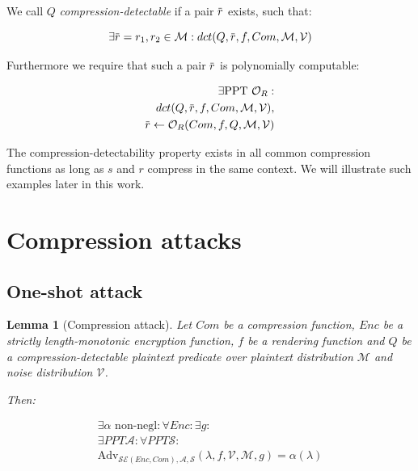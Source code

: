 \documentclass[conference, letterpaper, 10pt]{IEEEtran}
\newtheorem{lemma}{Lemma}
\newcommand{\overbar}[1]{\mkern 1.5mu\overline{\mkern-1.5mu#1\mkern-1.5mu}\mkern 1.5mu}
\begin{document}
We call $Q$ \textit{compression-detectable} if a pair $\overbar{r}$ exists,
such that:

\begin{equation*}
    \exists \overbar{r} = r_1, r_2 \in \mathcal{M}:
    dct(Q, \overbar{r}, f, Com, \mathcal{M}, \mathcal{V})
\end{equation*}

Furthermore we require that such a pair $\overbar{r}$ is polynomially
computable:

\begin{align*}
    \exists \text{PPT } \mathcal{O}_R:\\
    dct(Q, \overbar{r}, f, Com, \mathcal{M}, \mathcal{V}),\\
    \overbar{r} \leftarrow \mathcal{O}_R(Com, f, Q, \mathcal{M}, \mathcal{V})
\end{align*}

The compression-detectability property exists in all common compression
functions as long as $s$ and $r$ compress in the same context. We will
illustrate such examples later in this work.

\section{Compression attacks}\label{sec:comattack}

\subsection{One-shot attack}

\begin{lemma}[Compression attack]

Let $Com$ be a compression function, $Enc$ be a strictly length-monotonic
encryption function, $f$ be a rendering function and $Q$ be a
compression-detectable plaintext predicate over plaintext distribution
$\mathcal{M}$ and noise distribution $\mathcal{V}$.

Then:

\begin{align*}
    \exists \alpha \text{ non-negl}:
    \forall Enc:
    \exists g:\\
    \exists PPT \mathcal{A}:
    \forall PPT \mathcal{S}:\\
    \text{Adv}_{\mathcal{SE}(Enc, Com), \mathcal{A}, \mathcal{S}}
    (\lambda, f, \mathcal{V}, \mathcal{M}, g) = \alpha(\lambda)
\end{align*}

\end{lemma}
\end{document}
